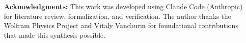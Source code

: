 \documentclass[11pt,a4paper]{article}
\theoremstyle{plain}
\theoremstyle{definition}
\theoremstyle{remark}
\begin{document}
\vspace{1em}
\noindent\textbf{Acknowledgments:} This work was developed using Claude Code (Anthropic) for literature review, formalization, and verification. The author thanks the Wolfram Physics Project and Vitaly Vanchurin for foundational contributions that made this synthesis possible.


\printbibliography
\end{document}
